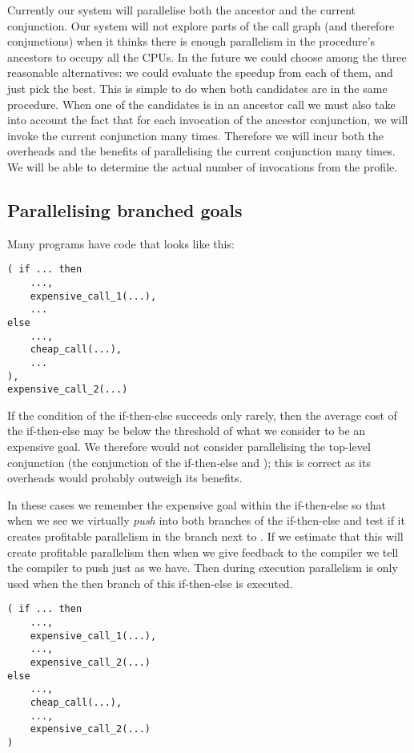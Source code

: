 Currently our system will parallelise both the ancestor and the current
conjunction.
Our system will not explore parts of the call graph
(and therefore conjunctions)
when it thinks there is enough parallelism in the procedure's ancestors
to occupy all the CPUs.
In the future we could choose among the three reasonable alternatives:
we could evaluate the speedup from each of them, and just pick the best.
This is simple to do when both candidates are in the same procedure.
When one of the candidates is in an ancestor call we must also 
take into account
the fact that for each invocation of the ancestor conjunction,
we will invoke the current conjunction many times.
Therefore we will incur both the overheads and the benefits
of parallelising the current conjunction many times.
We will be able to determine the actual number of invocations from the
profile.


\subsection{Parallelising branched goals}
\label{sec:overlap_pragma_push}

Many programs have code that looks like this:
\begin{verbatim}
( if ... then
    ...,
    expensive_call_1(...),
    ...
else
    ...,
    cheap_call(...),
    ...
),
expensive_call_2(...)
\end{verbatim}
If the condition of the if-then-else succeeds only rarely,
then the average cost of the if-then-else
may be below the threshold of what we consider to be an expensive goal.
We therefore would not consider
parallelising the top-level conjunction
(the conjunction of the if-then-else and );
this is correct as its overheads would probably outweigh its benefits.

In these cases we remember the expensive goal within the if-then-else
so that when we see  we virtually \emph{push}
 into both branches of the if-then-else and test if it
creates profitable parallelism in the branch next to
.
If we estimate that this will create profitable parallelism then when we
give feedback to the compiler we tell the compiler to push
 just as we have.
Then during execution parallelism is only used when the then branch of this
if-then-else is executed.
\begin{verbatim}
( if ... then
    ...,
    expensive_call_1(...),
    ...,
    expensive_call_2(...)
else
    ...,
    cheap_call(...),
    ...,
    expensive_call_2(...)
)
\end{verbatim}


